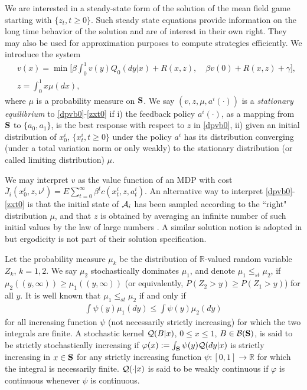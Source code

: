 \documentclass[graybox]{svmult}
\def\bS{{\bf S}}
\begin{document}
 We are interested in  a steady-state form of the
 solution of the mean field game starting with $\{z_t, t\ge 0\}$.
 Such steady state equations provide information on the long time behavior of the solution and  are of interest in their own right. They may also be used for approximation purposes to compute  strategies efficiently.
 We introduce the system
\begin{align}
&v(x) =  \min \Big[\beta \int_0^1 v( y) Q_0(dy|x) + R(x, z),  \quad \beta v(0) + R(x,z)+ \gamma\Big],  \label{dpvb0}\\
&z= \int_0^1x \mu(dx),\label{zxt0}\
\end{align}
where $\mu$ is a probability measure on ${\bf S}$.
We say $(v, z,  \mu,a^i(\cdot) )$ is  a {\it stationary equilibrium} to
\eqref{dpvb0}-\eqref{zxt0}
if i) the feedback policy $ a^i(\cdot)$, as a mapping from $\bS$ to $\{a_0, a_1\}$, is the best response with respect to $ z$
in \eqref{dpvb0}, ii) given an initial distribution of $x_0^i$,  $\{x_t^i, t\ge 0\}$ under the policy $ a^i$ has its distribution converging (under a total variation norm or only weakly) to the stationary distribution (or called limiting distribution) $ \mu$.


We may interpret $v$ as the value function of an MDP with cost
$\bar J_{i}(x_0^i,z, \nu^i)=   E \sum_{t=0}^\infty
\beta^t c(x_t^i, z, a_t^i)$.
An alternative way to interpret \eqref{dpvb0}-\eqref{zxt0} is that the initial state of ${\cal A}_i$ has been sampled according to the ``right" distribution $\mu$, and that $z$ is obtained by averaging an infinite number of such initial values by the law of large numbers \cite{S06}.
A similar solution notion is adopted in \cite{AJ15,AJW15} but
ergodicity is not part of their solution specification.

Let the probability measure  $\mu_k$ be the distribution  of
$\mathbb{R}$-valued random variable $Z_k$, $k=1, 2$.
We say $\mu_2$   stochastically dominates  $\mu_1$, and denote $\mu_1\le_{st} \mu_2$, if $\mu_2((y, \infty)) \ge \mu_1((y, \infty))$    (or equivalently,  $P(Z_2>y)\ge P(Z_1>y)$) for all $y$. It is well known \cite{MS02} that $\mu_1\le_{st} \mu_2$ if and only if
 \begin{align}
 \int \psi(y) \mu_1(dy)\le \int \psi(y) \mu_2(dy) \label{psi12}
 \end{align}
 for all increasing function $\psi$ (not necessarily strictly increasing) for which the two integrals are finite.
A stochastic kernel ${\cal Q}(B|x)$, $0\le x\le 1$, $B\in {\cal B}({\bf S}) $, is said to be strictly stochastically increasing if $\varphi(x):= \int_{\bf S}\psi (y){\cal Q}(dy|x)$ is strictly increasing in $x\in {\bf S}$ for any strictly increasing function $\psi: [0, 1]\to \mathbb{R}$ for which the integral is necessarily finite.
${\cal Q}(\cdot|x)$ is said to be weakly continuous if $\varphi$ is continuous whenever $\psi$ is continuous.
\end{document}
